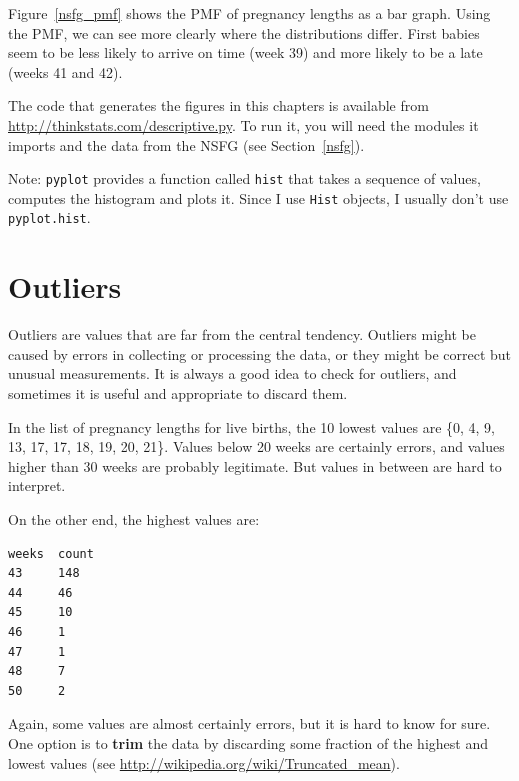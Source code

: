 \documentclass[12pt]{book}
\begin{document}
Figure~\ref{nsfg_pmf} shows the PMF of pregnancy lengths as a bar
graph.  Using the PMF, we can see more clearly where the distributions
differ.  First babies seem to be less likely to arrive on time (week
39) and more likely to be a late (weeks 41 and 42).

The code that generates the figures in this chapters is available from
\url{http://thinkstats.com/descriptive.py}.  To run it, you will need the
modules it imports and the data from the NSFG (see
Section~\ref{nsfg}).

Note: {\tt pyplot} provides a function called {\tt hist} that
takes a sequence of values, computes the histogram and plots it.
Since I use {\tt Hist} objects, I usually don't use {\tt pyplot.hist}.


\section{Outliers}

Outliers are values that are far from the central tendency.  Outliers
might be caused by errors in collecting or processing the data, or
they might be correct but unusual measurements.  It is always a good
idea to check for outliers, and sometimes it is useful and appropriate
to discard them.


In the list of pregnancy lengths for live births, the 10 lowest values
are \{0, 4, 9, 13, 17, 17, 18, 19, 20, 21\}.  Values below 20
weeks are certainly errors, and values higher than 30 weeks are
probably legitimate.  But values in between are
hard to interpret.

On the other end, the highest values are:
%
\begin{verbatim}
weeks  count
43     148
44     46
45     10
46     1
47     1
48     7
50     2
\end{verbatim}

Again, some values are almost certainly errors,
but it is hard to know for sure.  One option is to {\bf trim} the data
by discarding some fraction of the highest and lowest values (see
\url{http://wikipedia.org/wiki/Truncated_mean}).
\end{document}
